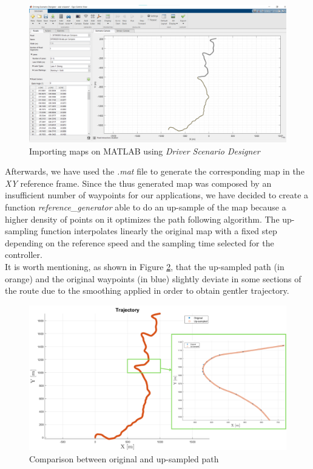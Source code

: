 \begin{figure}[H]
    \centering
    \includegraphics[width=1\textwidth]{Figures/DrivingScenarioTool.png}
    \caption{Importing maps on MATLAB using \textit{Driver Scenario Designer}}
      \label{fig:DrivingScenarioTool}
\end{figure}

Afterwards, we have used the \textit{.mat} file to generate the corresponding map in the \textit{XY} reference frame.
Since the thus generated map was composed by an insufficient number of waypoints for our applications, we have decided to create a function \textit{reference\_generator} able to do an up-sample of the map because a higher density of points on it optimizes the path following algorithm. The up-sampling function interpolates linearly the original map with a fixed step depending on the reference speed and the sampling time selected for the controller. \\
It is worth mentioning, as shown in Figure \ref{fig:UpSample}, that the up-sampled path (in orange) and the original waypoints (in blue) slightly deviate in some sections of the route due to the smoothing applied in order to obtain gentler trajectory.

\begin{figure}[H]
    \centering
    \includegraphics[width=1\textwidth]{Figures/UpSample.png}
    \caption{Comparison between original and up-sampled path}
      \label{fig:UpSample}
\end{figure}

